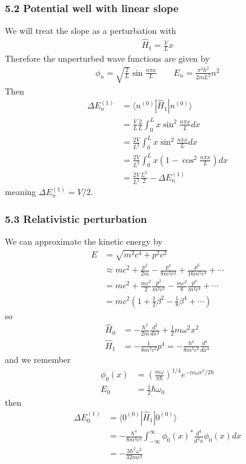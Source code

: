 \documentclass[10pt,a4paper]{book}
\theoremstyle{definition}
\begin{document}
\subsubsection{5.2 Potential well with linear slope}
We will treat the slope as a perturbation with
\begin{align}
\hat{H}_1=\frac{V}{L}x
\end{align} 
Therefore the unperturbed wave functions are given by
\begin{align}
\phi_n=\sqrt{\frac{2}{L}}\sin\frac{n\pi x}{L}\qquad
E_n=\frac{\pi^2\hbar^2}{2mL^2}n^2
\end{align}
Then
\begin{align}
\Delta E_n^{(1)}
&=\langle n^{(0)}|\hat{H}_1|n^{(0)}\rangle\\
&=\frac{V}{L}\frac{2}{L}\int_0^L x\sin^2\frac{n\pi x}{L}dx\\
&=\frac{2V}{L^2}\int_0^L x\sin^2\frac{n\pi x}{L}dx\\
&=\frac{2V}{L^2}\int_0^L x\left(1-\cos^2\frac{n\pi x}{L}\right)dx\\
&=\frac{2V}{L^2}\frac{L^2}{2}-\Delta E_n^{(1)}
\end{align}
meaning $\Delta E_n^{(1)}=V/2$.

\subsubsection{5.3 Relativistic perturbation}
We can approximate the kinetic energy by
\begin{align}
E&=\sqrt{m^2c^4+p^2c^2}\\
&\approx mc^2+\frac{p^2}{2m}-\frac{p^4}{8m^3c^2}+\frac{p^6}{16m^5c^4}+\cdots\\
&=mc^2+\frac{mc^2}{2}\frac{p^2}{m^2c^2}-\frac{mc^2}{8}\frac{p^4}{m^4c^4}+\cdots\\
&=mc^2\left(1+\frac{1}{2}\beta^2-\frac{1}{8}\beta^4+\cdots\right)
\end{align}
so
\begin{align}
\hat{H}_0&=-\frac{\hbar^2}{2m}\frac{d^2}{dx^2}+\frac{1}{2}m\omega^2x^2\\
\hat{H}_1&=-\frac{1}{8m^3c^2}p^4=-\frac{\hbar^4}{8m^3c^2}\frac{d^4}{dx^4}
\end{align}
and we remember
\begin{align}
\phi_0(x)&=\left(\frac{m\omega}{\pi\hbar}\right)^{1/4}e^{-m\omega x^2/2\hbar}\\
E_0&=\frac{1}{2}\hbar\omega_0
\end{align}
then
\begin{align}
\Delta E_0^{(1)}&=\langle 0^{(0)}|\hat{H}_1|0^{(0)}\rangle\\
&=-\frac{\hbar^4}{8m^3c^2}\int_{-\infty}^\infty\phi_0(x)^*\frac{d^4}{d^4x}\phi_0(x)dx\\
&=-\frac{3\hbar^2\omega^2}{32mc^2}
\end{align}
\end{document}
